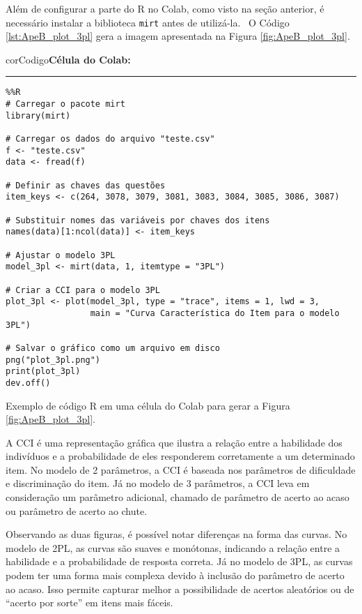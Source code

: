 Além de configurar a parte do R no Colab, como visto na seção anterior, é necessário instalar a biblioteca \verb|mirt| antes de utilizá-la. 
\
O Código \ref{lst:ApeB_plot_3pl} gera a imagem apresentada na Figura \ref{fig:ApeB_plot_3pl}. 

\begin{listing}[!ht]
    \begin{myboxCode}{corCodigo}{\textbf{Célula do Colab: }}\vspace{3mm}
    \hrule
    \begin{verbatim}
%%R
# Carregar o pacote mirt
library(mirt)

# Carregar os dados do arquivo "teste.csv"
f <- "teste.csv"
data <- fread(f)

# Definir as chaves das questões
item_keys <- c(264, 3078, 3079, 3081, 3083, 3084, 3085, 3086, 3087)

# Substituir nomes das variáveis por chaves dos itens
names(data)[1:ncol(data)] <- item_keys

# Ajustar o modelo 3PL
model_3pl <- mirt(data, 1, itemtype = "3PL")

# Criar a CCI para o modelo 3PL
plot_3pl <- plot(model_3pl, type = "trace", items = 1, lwd = 3, 
                 main = "Curva Característica do Item para o modelo 3PL")

# Salvar o gráfico como um arquivo em disco
png("plot_3pl.png")
print(plot_3pl)
dev.off()
\end{verbatim}
\end{myboxCode}
\caption{Exemplo de código R em uma célula do Colab para gerar a Figura \ref{fig:ApeB_plot_3pl}.}
\label{lst:ApeB_plot_3pl}
\end{listing}


A CCI é uma representação gráfica que ilustra a relação entre a habilidade dos indivíduos e a probabilidade de eles responderem corretamente a um determinado item. No modelo de 2 parâmetros, a CCI é baseada nos parâmetros de dificuldade e discriminação do item. Já no modelo de 3 parâmetros, a CCI leva em consideração um parâmetro adicional, chamado de parâmetro de acerto ao acaso ou parâmetro de acerto ao chute.

Observando as duas figuras, é possível notar diferenças na forma das curvas. No modelo de 2PL, as curvas são suaves e monótonas, indicando a relação entre a habilidade e a probabilidade de resposta correta. Já no modelo de 3PL, as curvas podem ter uma forma mais complexa devido à inclusão do parâmetro de acerto ao acaso. Isso permite capturar melhor a possibilidade de acertos aleatórios ou de ``acerto por sorte'' em itens mais fáceis.

